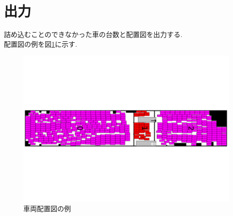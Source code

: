 \section{出力}
詰め込むことのできなかった車の台数と配置図を出力する. \\
配置図の例を図\ref{figure22}に示す.
\begin{figure}[b]
    \hspace{2cm}
    \includegraphics[scale=0.3, bb = 0 0 1 1]{2car_haichi.pdf}
    \caption{車両配置図の例}
    \label{figure22}
\end{figure}



